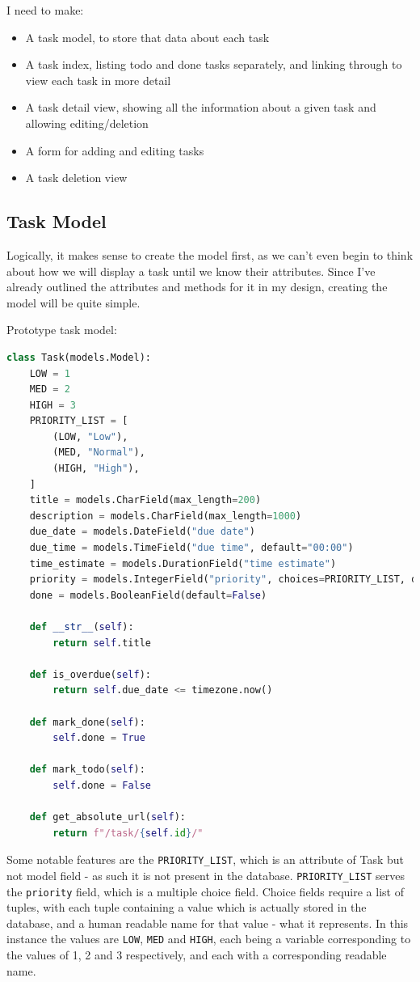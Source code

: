 \documentclass{article}
\begin{document}
I need to make:
\begin{itemize}
	\item A task model,
	      to store that data about each task
	\item A task index,
	      listing todo and done tasks separately,
	      and linking through to view each task in more detail
	\item A task detail view,
	      showing all the information about a given task and allowing editing/deletion
	\item A form for adding and editing tasks
	\item A task deletion view
\end{itemize}

\subsection{Task Model}
Logically, it makes sense to create the model first,
as we can't even begin to think about how we will display a task until we know their attributes.
Since I've already outlined the attributes and methods for it in my design,
creating the model will be quite simple.

Prototype task model:
\begin{lstlisting}[language=Python]
class Task(models.Model):
    LOW = 1
    MED = 2
    HIGH = 3
    PRIORITY_LIST = [
        (LOW, "Low"),
        (MED, "Normal"),
        (HIGH, "High"),
    ]
    title = models.CharField(max_length=200)
    description = models.CharField(max_length=1000)
    due_date = models.DateField("due date")
    due_time = models.TimeField("due time", default="00:00")
    time_estimate = models.DurationField("time estimate")
    priority = models.IntegerField("priority", choices=PRIORITY_LIST, default=2)
    done = models.BooleanField(default=False)

    def __str__(self):
        return self.title

    def is_overdue(self):
        return self.due_date <= timezone.now()

    def mark_done(self):
        self.done = True

    def mark_todo(self):
        self.done = False

    def get_absolute_url(self):
        return f"/task/{self.id}/"
\end{lstlisting}

Some notable features are the \texttt{PRIORITY\_LIST},
which is an attribute of Task but not model field -
as such it is not present in the database.
\texttt{PRIORITY\_LIST} serves the \texttt{priority} field,
which is a multiple choice field.
Choice fields require a list of tuples,
with each tuple containing a value which is actually stored in the database,
and a human readable name for that value - what it represents.
In this instance the values are \texttt{LOW}, \texttt{MED} and \texttt{HIGH},
each being a variable corresponding to the values of 1, 2 and 3 respectively,
and each with a corresponding readable name.
\end{document}
